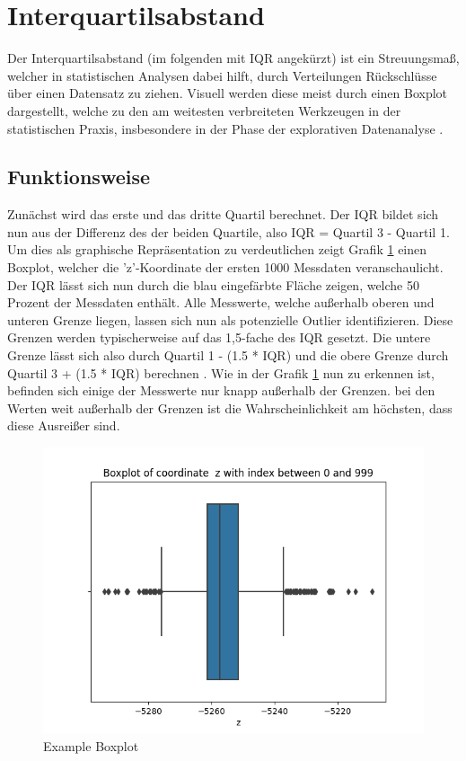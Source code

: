 \section{Interquartilsabstand}
Der Interquartilsabstand (im folgenden mit IQR angekürzt) ist ein Streuungsmaß, welcher in statistischen Analysen dabei hilft, durch Verteilungen Rückschlüsse über einen Datensatz zu ziehen. Visuell werden diese meist durch einen Boxplot dargestellt, welche zu den am weitesten verbreiteten Werkzeugen in der statistischen Praxis, insbesondere in der Phase der explorativen Datenanalyse \cite{dovoedoBoxplotBasedOutlierDetection2015}.
\subsection{Funktionsweise}
Zunächst wird das erste und das dritte Quartil berechnet. Der IQR bildet sich nun aus der Differenz des der beiden Quartile, also IQR = Quartil 3 - Quartil 1. Um dies als graphische Repräsentation zu verdeutlichen zeigt Grafik \ref{fig:boxplot_example} einen Boxplot, welcher die 'z'-Koordinate der ersten 1000 Messdaten veranschaulicht. Der IQR lässt sich nun durch die blau eingefärbte Fläche zeigen, welche 50 Prozent der Messdaten enthält. Alle Messwerte, welche außerhalb oberen und unteren Grenze liegen, lassen sich nun als potenzielle Outlier identifizieren. Diese Grenzen werden typischerweise auf das 1,5-fache des IQR gesetzt. Die untere Grenze lässt sich also durch Quartil 1 - (1.5 * IQR) und die obere Grenze durch Quartil 3 + (1.5 * IQR) berechnen \cite{vinuthaDetectionOutliersUsing2018}. Wie in der Grafik \ref{fig:boxplot_example} nun zu erkennen ist, befinden sich einige der Messwerte nur knapp außerhalb der Grenzen. bei den Werten weit außerhalb der Grenzen ist die Wahrscheinlichkeit am höchsten, dass diese Ausreißer sind.

\begin{figure}[h!]
	\includegraphics[width=\textwidth]{img/boxplot_example.png}
	\caption{Example Boxplot}
	\label{fig:boxplot_example}
\end{figure}

